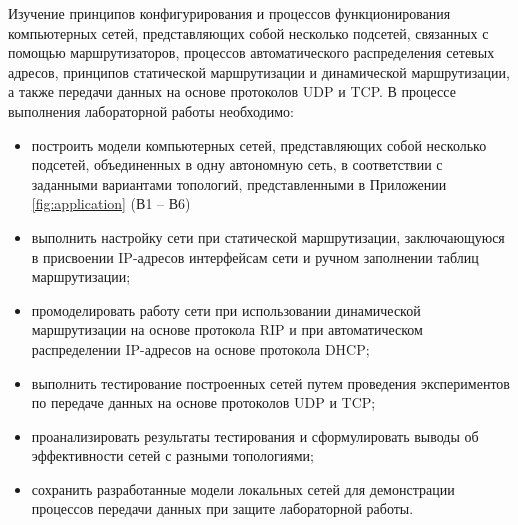 


\tableofcontents


\newpage
\Chapter{\lab\ \labnumber}{\labtheme}{}


Изучение принципов конфигурирования и процессов функционирования 
компьютерных сетей, представляющих собой несколько подсетей, связанных с 
помощью маршрутизаторов, процессов автоматического распределения сетевых 
адресов, принципов статической маршрутизации и динамической 
маршрутизации, а также передачи данных на основе протоколов UDP и TCP.
В процессе выполнения лабораторной работы необходимо:
\begin{itemize}
    \item построить модели компьютерных сетей, представляющих собой несколько
подсетей, объединенных в одну автономную сеть, в соответствии с 
заданными вариантами топологий, представленными в Приложении  \ref{fig:application} (В1 – В6)
\item выполнить настройку сети при статической маршрутизации, 
заключающуюся в присвоении IP-адресов интерфейсам сети и ручном 
заполнении таблиц маршрутизации;
\item промоделировать работу сети при использовании динамической 
маршрутизации на основе протокола RIP и при автоматическом 
распределении IP-адресов на основе протокола DHCP;
\item выполнить тестирование построенных сетей путем проведения 
экспериментов по передаче данных на основе протоколов UDP и TCP;
\item проанализировать результаты тестирования и сформулировать выводы об 
эффективности сетей с разными топологиями;
\item сохранить разработанные модели локальных сетей для демонстрации 
процессов передачи данных при защите лабораторной работы. 
\end{itemize}

